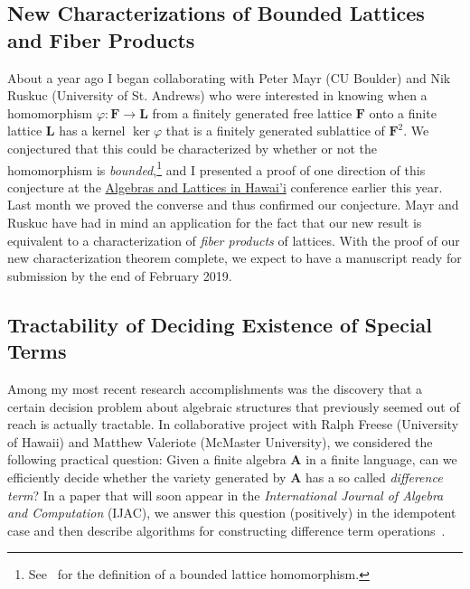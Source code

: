 \documentclass[11pt]{amsart}
\newcommand\alg[1]{\mathbf{#1}}
\begin{document}
  
\subsection{New Characterizations of Bounded Lattices and Fiber Products}
\label{sec:fiber}
About a year ago I began collaborating with Peter Mayr (CU Boulder) and Nik Ruskuc (University of St. Andrews) who were interested in knowing when a homomorphism $\varphi \colon \mathbf{F} \to \mathbf{L}$ from a finitely generated free lattice $\mathbf{F}$ onto a finite lattice $\mathbf L$ has a kernel $\ker \varphi$ that is a finitely generated sublattice of $\mathbf{F}^2$.  We conjectured that this could be characterized by whether or not the homomorphism is \emph{bounded},\footnote{See~\cite{MR1319815} for the definition of a bounded lattice homomorphism.} and I presented a proof of one direction of this conjecture at the \href{https://universalalgebra.github.io/ALH-2018/}{Algebras and Lattices in Hawai'i} conference earlier this year. Last month we proved the converse and thus confirmed our conjecture.  Mayr and Ruskuc have had in mind an application for the fact that our new result is equivalent to a characterization of \emph{fiber products} of lattices.  With the proof of our new characterization theorem complete, we expect to have a manuscript ready for submission by the end of February 2019.  


\subsection{Tractability of Deciding Existence of Special Terms}
\label{sec:diffterm}
Among my most recent research accomplishments was the discovery that a certain decision problem about algebraic structures that previously seemed out of reach is actually tractable. In collaborative project with Ralph Freese (University of Hawaii) and Matthew Valeriote (McMaster University), we considered the following practical question: Given a finite algebra $\alg{A}$ in a finite language, can we efficiently decide whether the variety generated by $\alg{A}$ has a so called \emph{difference term}? In a paper that will soon appear in the \emph{International Journal of Algebra and Computation} (IJAC), we answer this question (positively) in the idempotent case and then describe algorithms for constructing difference term operations~\cite{DFV:2018}.
 
\end{document}
